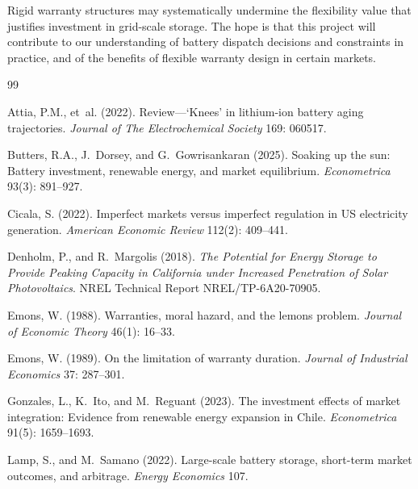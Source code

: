 \documentclass[12pt]{article}
\begin{document}
Rigid warranty structures may systematically undermine the flexibility value that justifies investment in grid-scale storage. The hope is that this project will contribute to our understanding of battery dispatch decisions and constraints in practice, and of the benefits of flexible warranty design in certain markets.


\newpage
\begin{singlespace}

\begin{thebibliography}{99}

  Attia, P.M., et~al. (2022).
  \newblock Review---`Knees' in lithium-ion battery aging trajectories.
  \newblock \textit{Journal of The Electrochemical Society} 169: 060517.

  Butters, R.A., J.~Dorsey, and G.~Gowrisankaran (2025).
  \newblock Soaking up the sun: Battery investment, renewable energy, and market
    equilibrium.
  \newblock \textit{Econometrica} 93(3): 891--927.

  Cicala, S. (2022).
  \newblock Imperfect markets versus imperfect regulation in US electricity
    generation.
  \newblock \textit{American Economic Review} 112(2): 409--441.

  Denholm, P., and R.~Margolis (2018).
  \newblock \textit{The Potential for Energy Storage to Provide Peaking Capacity
    in California under Increased Penetration of Solar Photovoltaics}.
  \newblock NREL Technical Report NREL/TP-6A20-70905.

  Emons, W. (1988).
  \newblock Warranties, moral hazard, and the lemons problem.
  \newblock \textit{Journal of Economic Theory} 46(1): 16--33.

  Emons, W. (1989).
  \newblock On the limitation of warranty duration.
  \newblock \textit{Journal of Industrial Economics} 37: 287--301.

  Gonzales, L., K.~Ito, and M.~Reguant (2023).
  \newblock The investment effects of market integration: Evidence from renewable
    energy expansion in Chile.
  \newblock \textit{Econometrica} 91(5): 1659--1693.

  Lamp, S., and M.~Samano (2022).
  \newblock Large-scale battery storage, short-term market outcomes, and
    arbitrage.
  \newblock \textit{Energy Economics} 107.


\end{thebibliography}
\end{singlespace}
\end{document}

